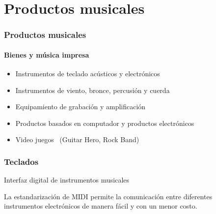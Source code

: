\documentclass[xcolor=table]{beamer}
\begin{document}
	\section{Productos musicales}
	\begin{frame}
		\frametitle{Productos musicales}
		\framesubtitle{Bienes y música impresa}
		\begin{itemize}
			\item Instrumentos de teclado acústicos y electrónicos
			\item Instrumentos de viento, bronce, percusión y cuerda
			\item Equipamiento de grabación y amplificación
			\item Productos basados en computador y productos electrónicos
			\item Video juegos~\cite{passman2011all} (Guitar Hero, Rock Band)
		\end{itemize}
	\end{frame}
	\begin{frame}
		\frametitle{Teclados}
		\begin{tcolorbox}[colback=white,colframe=udlacolour,title=MIDI]
    			Interfaz digital de instrumentos musicales
    		\end{tcolorbox}
		La estandarización de MIDI permite la comunicación entre diferentes instrumentos electrónicos de manera fácil y con un menor costo.
	\end{frame}
\end{document}
